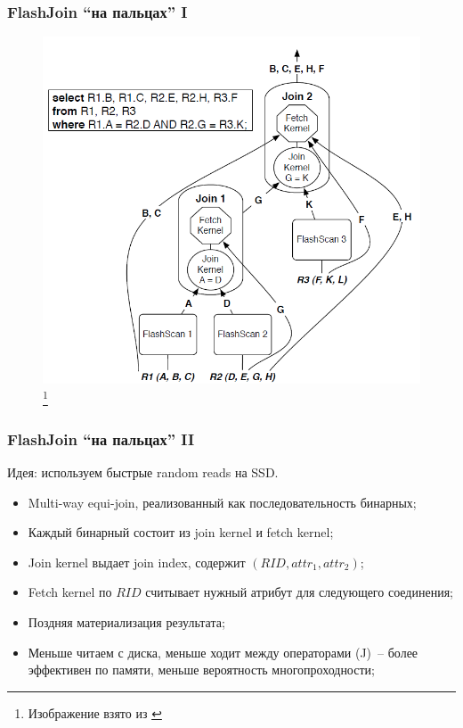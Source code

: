 \documentclass{beamer}
\begin{document}
\begin{frame}
\frametitle{FlashJoin ``на пальцах'' I}

\begin{figure}[htb]
\includegraphics[width=\textwidth,height=0.75\textheight,keepaspectratio]{flashjoin.png} 
\footnote{\tiny{Изображение взято из \cite{Tsirogiannis2009}}}
\end{figure}

\end{frame}


\begin{frame}
\frametitle{FlashJoin ``на пальцах'' II}

Идея: используем быстрые random reads на SSD.

\begin{itemize}
  \item Multi-way equi-join, реализованный как последовательность бинарных;
  \item Каждый бинарный состоит из join kernel и fetch kernel;
  \item Join kernel выдает join index, содержит $(RID, attr_1, attr_2)$;
  \item Fetch kernel по $RID$ считывает нужный атрибут для следующего соединения;
  \item Поздняя материализация результата;
  \item Меньше читаем с диска, меньше ходит между операторами (J)~-- более эффективен по памяти, меньше вероятность многопроходности;
\end{itemize}

\end{frame}
\end{document}
